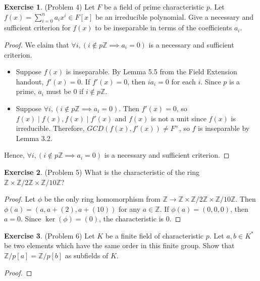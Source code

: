 \documentclass[12pt, psamsfonts]{amsart}
\theoremstyle{definition}
\newtheorem*{exer}{Exercise}
\theoremstyle{remark}
\numberwithin{equation}{section}
\begin{document}
\begin{exer}{(Problem 4)}
  Let $F$ be a field of prime characteristic $p$.
  Let $f(x) = \sum_{i=0}^n a_ix^i \in F[x]$ be an irreducible polynomial.
  Give a necessary and sufficient criterion for $f(x)$ to be inseparable in terms of the coefficients $a_i$.
\end{exer}

\begin{proof}
  We claim that $\forall i, (i \notin p\mathbb{Z} \implies a_i = 0)$ is a necessary and sufficient criterion.
  \begin{itemize}
    \item
      Suppose $f(x)$ is inseparable.
      By Lemma 5.5 from the Field Extension handout, $f'(x) = 0$.
      If $f'(x) = 0$, then $ia_i = 0$ for each $i$.
      Since $p$ is a prime, $a_i$ must be $0$ if $i \notin p\mathbb{Z}$.
    \item
      Suppose $\forall i, (i \notin p\mathbb{Z} \implies a_i = 0)$.
      Then $f'(x) = 0$, so $f(x) \mid f(x), f(x) \mid f'(x)$ and $f(x)$ is not a unit since $f(x)$ is irreducible.
      Therefore, $GCD(f(x), f'(x)) \ne F^{\times}$, so $f$ is inseparable by Lemma 3.2.
  \end{itemize}
  Hence, $\forall i, (i \notin p\mathbb{Z} \implies a_i = 0)$ is a necessary and sufficient criterion.
\end{proof}

\begin{exer}{(Problem 5)}
  What is the characteristic of the ring $\mathbb{Z} \times \mathbb{Z} / 2\mathbb{Z} \times \mathbb{Z} / 10\mathbb{Z}$?
\end{exer}

\begin{proof}
  Let $\phi$ be the only ring homomorphism from $\mathbb{Z} \rightarrow \mathbb{Z} \times \mathbb{Z} / 2\mathbb{Z} \times \mathbb{Z} / 10\mathbb{Z}$.
  Then $\phi(a) = (a, a + (2), a + (10))$ for any $a \in \mathbb{Z}$.
  If $\phi(a) = (0, 0, 0)$, then $a = 0$.
  Since $\ker(\phi) = (0)$, the characteristic is 0.
\end{proof}

\begin{exer}{(Problem 6)}
  Let $K$ be a finite field of characteristic $p$.
  Let $a, b \in K^*$ be two elements which have the same order in this finite group.
  Show that $\mathbb{Z}/p[a] = \mathbb{Z}/p[b]$ as subfields of $K$.
\end{exer}

\begin{proof}
\end{proof}
\end{document}

